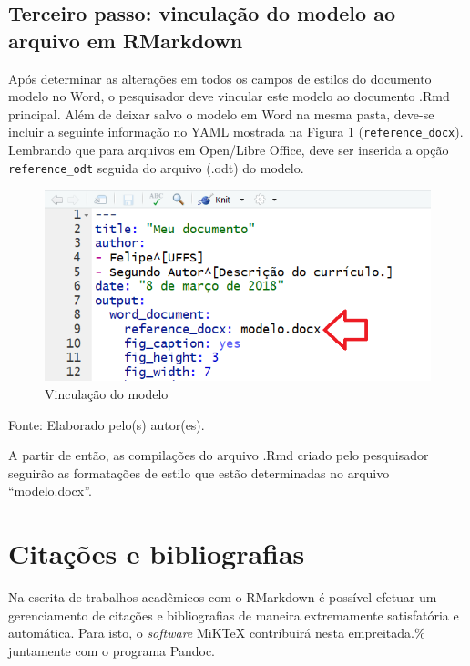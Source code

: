 \documentclass[12pt,brazil,oneside]{book}
\begin{document}
\hypertarget{terceiro-passo-vinculacao-do-modelo-ao-arquivo-em-rmarkdown}{%
\subsection{Terceiro passo: vinculação do modelo ao arquivo em RMarkdown}\label{terceiro-passo-vinculacao-do-modelo-ao-arquivo-em-rmarkdown}}

Após determinar as alterações em todos os campos de estilos do documento modelo no Word, o pesquisador deve vincular este modelo ao documento .Rmd principal. Além de deixar salvo o modelo em Word na mesma pasta, deve-se incluir a seguinte informação no YAML mostrada na Figura \ref{fig:rmarkestilos2} (\texttt{reference\_docx}). Lembrando que para arquivos em Open/Libre Office, deve ser inserida a opção \texttt{reference\_odt} seguida do arquivo (.odt) do modelo.

\begin{figure}[H]

{\centering \includegraphics[width=0.7\linewidth]{rmarkestilos2} 

}

\caption{Vinculação do modelo}\label{fig:rmarkestilos2}
\end{figure}

Fonte: Elaborado pelo(s) autor(es).

A partir de então, as compilações do arquivo .Rmd criado pelo pesquisador seguirão as formatações de estilo que estão determinadas no arquivo ``modelo.docx''.

\hypertarget{citacoes-e-bibliografias}{%
\section{Citações e bibliografias}\label{citacoes-e-bibliografias}}

Na escrita de trabalhos acadêmicos com o RMarkdown é possível efetuar um gerenciamento de citações e bibliografias de maneira extremamente satisfatória e automática. Para isto, o \emph{software} MiKTeX contribuirá nesta empreitada.\% juntamente com o programa Pandoc.
\end{document}
